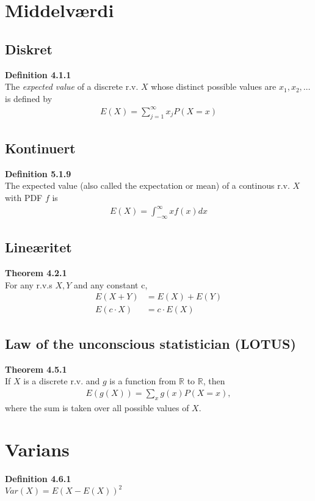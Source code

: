 \documentclass{article}
\begin{document}
\section*{Middelværdi}
\subsection*{Diskret}
\textbf{Definition 4.1.1}\\
The \textit{expected value} of a discrete r.v. $X$ whose distinct possible values are $x_1,x_2, \hdots$ is defined by
\begin{align*}
  E(X) = \sum_{j=1}^{\infty}{x_j P(X = x)}
\end{align*}

\subsection*{Kontinuert}
\textbf{Definition 5.1.9}\\
The expected value (also called the expectation or mean) of a continous r.v. $X$ with PDF $f$ is\\
\begin{align*}
  E(X) = \int^{\infty}_{-\infty}{x f(x)}dx
\end{align*}
\subsection*{Lineæritet}
\textbf{Theorem 4.2.1}\\
For any r.v.s $X,Y$ and any constant c,
\begin{align*}
  E(X + Y) &= E(X) + E(Y)\\
  E(c \cdot X) &= c \cdot E(X)
\end{align*}



\subsection*{Law of the unconscious statistician (LOTUS)}
\textbf{Theorem 4.5.1}\\
If $X$ is a discrete r.v. and $g$ is a function from $\mathbb{R}$ to $\mathbb{R}$, then
\begin{align*}
  E(g(X)) = \sum_{x}{g(x) P(X = x)},
\end{align*}
where the sum is taken over all possible values of $X$.

\section*{Varians}
\textbf{Definition 4.6.1}\\
$Var(X) = E(X - E(X))^2$\\
\end{document}

